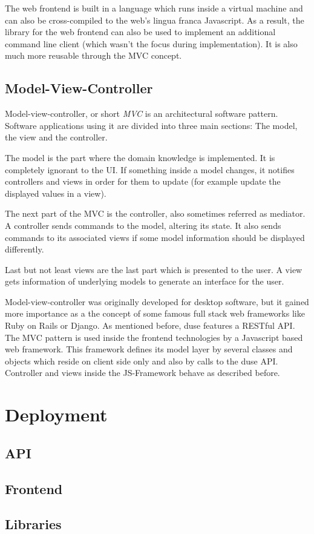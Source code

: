 The web frontend is built in a language which runs inside a virtual machine and
can also be cross-compiled to the web's lingua franca Javascript. As a result,
the library for the web frontend can also be used to implement an
additional command line client (which wasn't the focus during implementation).
It is also much more reusable through the MVC concept.

\subsection{Model-View-Controller}

Model-view-controller, or short \textit{MVC} is an architectural software pattern.
Software applications using it are divided into three main sections: The model,
the view and the controller.

The model is the part where the domain knowledge is implemented. It is completely
ignorant to the UI. If something inside a model changes, it notifies controllers
and views in order for them to update (for example update the displayed values
in a view).

The next part of the MVC is the controller, also sometimes referred as mediator.
A controller sends commands to the model, altering its state. It also sends commands
to its associated views if some model information should be displayed differently.

Last but not least views are the last part which is presented to the user. A view
gets information of underlying models to generate an interface for the user.

Model-view-controller was originally developed for desktop software, but it gained
more importance as a the concept of some famous full stack web frameworks like
Ruby on Rails or Django. As mentioned before, duse features a RESTful API. The 
MVC pattern is used inside the frontend technologies by a Javascript based web
framework. This framework defines its model layer by several classes and objects
which reside on client side only and also by calls to the duse API. Controller and
views inside the JS-Framework behave as described before.

\section{Deployment}
\subsection{API}
\subsection{Frontend}
\subsection{Libraries}
